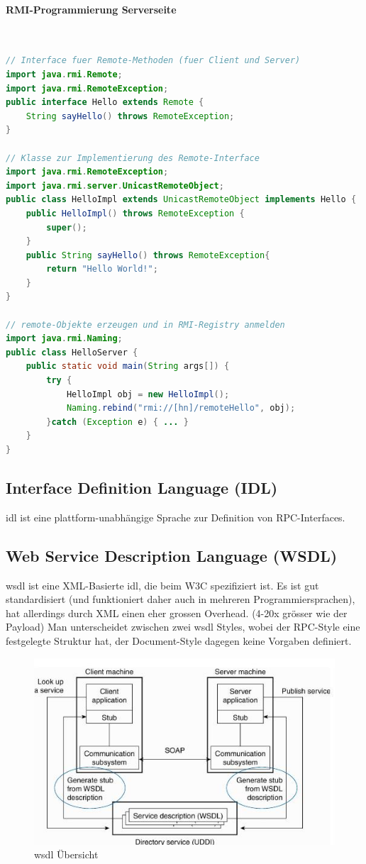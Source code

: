 \paragraph{RMI-Programmierung Serverseite} \hfill \\
\begin{lstlisting}[language=java]
// Interface fuer Remote-Methoden (fuer Client und Server)
import java.rmi.Remote;
import java.rmi.RemoteException;
public interface Hello extends Remote {
	String sayHello() throws RemoteException;
}

// Klasse zur Implementierung des Remote-Interface
import java.rmi.RemoteException;
import java.rmi.server.UnicastRemoteObject;
public class HelloImpl extends UnicastRemoteObject implements Hello {
	public HelloImpl() throws RemoteException {
		super();
	}
	public String sayHello() throws RemoteException{
		return "Hello World!";
	}
}

// remote-Objekte erzeugen und in RMI-Registry anmelden
import java.rmi.Naming;
public class HelloServer {
	public static void main(String args[]) {
		try {
			HelloImpl obj = new HelloImpl();
			Naming.rebind("rmi://[hn]/remoteHello", obj);
		}catch (Exception e) { ... }
	}
}
\end{lstlisting}

\subsection{Interface Definition Language (IDL)}

\gls{idl} ist eine plattform-unabhängige Sprache zur Definition von RPC-Interfaces.


\subsection{Web Service Description Language (WSDL)}

\gls{wsdl} ist eine XML-Basierte \gls{idl}, die beim W3C spezifiziert ist. Es ist gut standardisiert (und funktioniert daher auch in mehreren Programmiersprachen), hat allerdings durch XML einen eher grossen Overhead. (4-20x grösser wie der Payload) Man unterscheidet zwischen zwei \gls{wsdl} Styles, wobei der RPC-Style eine festgelegte Struktur hat, der Document-Style dagegen keine Vorgaben definiert. 

\begin{figure}[h]
	\centering
	\includegraphics[width=0.7\linewidth]{img/wsdl_overview}
	\caption{\gls{wsdl} Übersicht}
	\label{fig:wsdloverview}
\end{figure}

